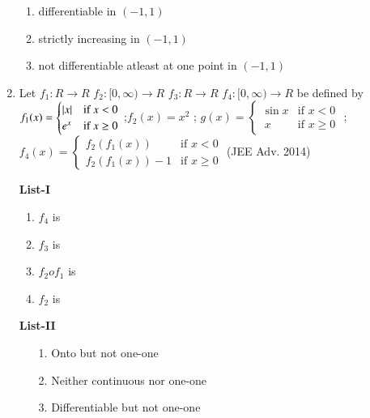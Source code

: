 \documentclass[journal,12pt,twocolumn]{IEEEtran}
\theoremstyle{remark}
\begin{document}
\begin{enumerate}
\begin{multicols}{2}
\begin{enumerate}
					\item differentiable in $(-1,1)$

					\item strictly increasing in $(-1,1)$

					\item  not differentiable atleast at one point in  $(-1,1)$
				\end{enumerate}
			\end{multicols}
		\item Let $f_1:R\rightarrow R$ $f_2:[0,\infty)\rightarrow R$ $f_3:R\rightarrow R$ $f_4:[0,\infty)\rightarrow R$ be defined by 
         $f_1(x) =
        \begin{cases}
		\left\vert x\right\vert & \text{if } x < 0 \\
                 e^x & \text{if } x \geq 0 
                 \end{cases}$
                 ;$f_2(x)=x^2$ ; $g(x) =
                 \begin{cases}
			 \sin{x} & \text{if }  x < 0 \\
                    \ x & \text{if }  x\geq 0
                  \end{cases}$
                  ;$f_4(x) =
                  \begin{cases}
                     f_2(f_1(x)) & \text{if } x < 0 \\
                     f_2(f_1(x))-1 & \text{if } x \geq 0 
                  \end{cases}$
                  \hfill(JEE Adv. 2014)
                 \begin{multicols}{2} 
				\textbf{List-I} 
				\begin{enumerate}[label=\Alph*., start=16]
					\item $f_4$ is
					\item $f_3$ is 
					\item $f_2of_1$ is 
					\item $f_2$ is
				\end{enumerate}
				\columnbreak
				\textbf{List-II}
				\begin{enumerate}
					\item[1.]  Onto but not one-one 

					\item[2.]  Neither continuous nor one-one 

					\item[3.]  Differentiable but not one-one 


\end{enumerate}
\end{multicols}
\end{enumerate}
\end{document}
